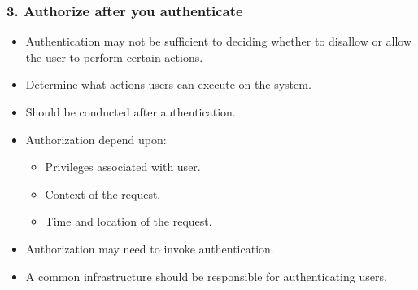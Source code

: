 \documentclass[12pt,norsk]{beamer}
\begin{document}
\begin{frame}

	\frametitle{3. Authorize after you authenticate}

	\begin{itemize}
		\item Authentication may not be sufficient to deciding whether to disallow or allow the user to perform certain actions.
		\item Determine what actions users can execute on the system.
		\item Should be conducted after authentication. 
		\item Authorization depend upon:
		\begin{itemize}
			\item Privileges associated with user.
			\item Context of the request.
			\item Time and location of the request.
		\end{itemize}
		\item Authorization may need to invoke authentication.
		\item A common infrastructure should be responsible for authenticating users.
		
		
	\end{itemize}		

\end{frame}
\end{document}
